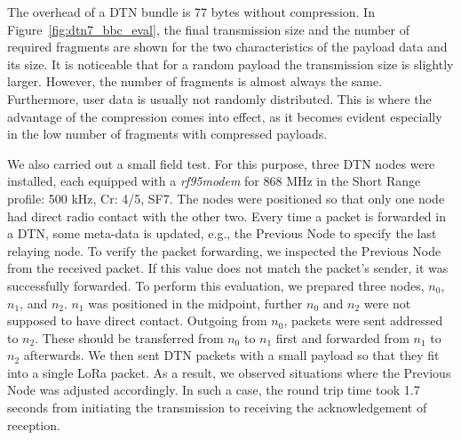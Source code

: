 The overhead of a DTN bundle is 77 bytes without compression.
In Figure~\ref{fig:dtn7_bbc_eval}, the final transmission size and the number of required fragments are shown for the two characteristics of the payload data and its size.
It is noticeable that for a random payload the transmission size is slightly larger.
However, the number of fragments is almost always the same.
Furthermore, user data is usually not randomly distributed.
This is where the advantage of the compression comes into effect, as it becomes evident especially in the low number of fragments with compressed payloads.

We also carried out a small field test.
For this purpose, three DTN nodes were installed, each equipped with a \textit{rf95modem} for 868 MHz in the Short Range profile: 500 kHz, Cr: 4/5, SF7.
The nodes were positioned so that only one node had direct radio contact with the other two.
Every time a packet is forwarded in a DTN, some meta-data is updated, e.g., the Previous Node to specify the last relaying node.
To verify the packet forwarding, we inspected the Previous Node from the received packet.
If this value does not match the packet's sender, it was successfully forwarded.
To perform this evaluation, we prepared three nodes, $n_0$, $n_1$, and $n_2$.
$n_1$ was positioned in the midpoint, further $n_0$ and $n_2$ were not supposed to have direct contact.
Outgoing from $n_0$, packets were sent addressed to $n_2$.
These should be transferred from $n_0$ to $n_1$ first and forwarded from $n_1$ to $n_2$ afterwards.
We then sent DTN packets with a small payload so that they fit into a single LoRa packet.
As a result, we observed situations where the Previous Node was adjusted accordingly.
In such a case, the round trip time took 1.7 seconds from initiating the transmission to receiving the acknowledgement of reception.


